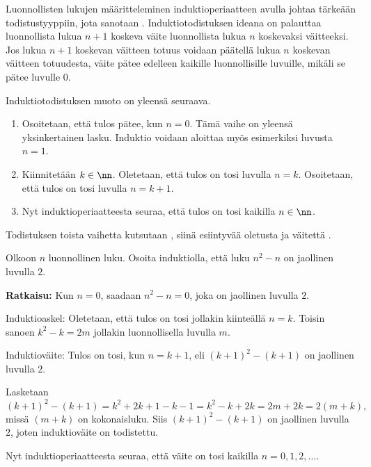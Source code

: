 Luonnollisten lukujen määritteleminen induktioperiaatteen avulla johtaa tärkeään todistustyyppiin, jota sanotaan . Induktiotodistuksen ideana on palauttaa luonnollista lukua $n+1$ koskeva väite luonnollista lukua $n$ koskevaksi väitteeksi. Jos lukua $n+1$ koskevan väitteen totuus voidaan päätellä lukua $n$ koskevan väitteen totuudesta, väite pätee  edelleen kaikille luonnollisille luvuille, mikäli se pätee luvulle $0$. 

Induktiotodistuksen muoto on yleensä seuraava.
\begin{enumerate}
\item Osoitetaan, että tulos pätee, kun $n=0$. Tämä vaihe on yleensä yksinkertainen lasku. Induktio voidaan aloittaa myös esimerkiksi luvusta $n=1$.
\item Kiinnitetään $k\in \nn$. Oletetaan, että tulos on tosi luvulla $n=k$. Osoitetaan, että tulos on tosi luvulla $n=k+1$.
\item Nyt induktioperiaatteesta seuraa, että tulos on tosi kaikilla $n\in \nn$.
\end{enumerate}
Todistuksen toista vaihetta kutsutaan , siinä esiintyvää oletusta  ja väitettä .

\begin{esimerkki}
Olkoon $n$ luonnollinen luku. Osoita induktiolla, että luku $n^2-n$ on jaollinen luvulla $2$.

{\bf Ratkaisu:} 
Kun $n=0$, saadaan $n^2-n=0$, joka on jaollinen luvulla $2$.

Induktioaskel: Oletetaan, että tulos on tosi jollakin kiinteällä $n=k$. Toisin sanoen $k^2-k=2m$ jollakin luonnollisella luvulla $m$. 

Induktioväite: Tulos on tosi, kun $n=k+1$, eli $(k+1)^2-(k+1)$ on jaollinen luvulla $2$.

Lasketaan
\[
(k+1)^2-(k+1)= k^2+2k+1-k-1= k^2-k +2k=2m +2k =2(m+k),
\]
missä $(m+k)$ on kokonaisluku. Siis $(k+1)^2-(k+1)$ on jaollinen luvulla $2$, joten induktioväite on todistettu.

Nyt induktioperiaatteesta seuraa, että väite on tosi kaikilla $n=0, 1, 2, \ldots$.
\end{esimerkki}

